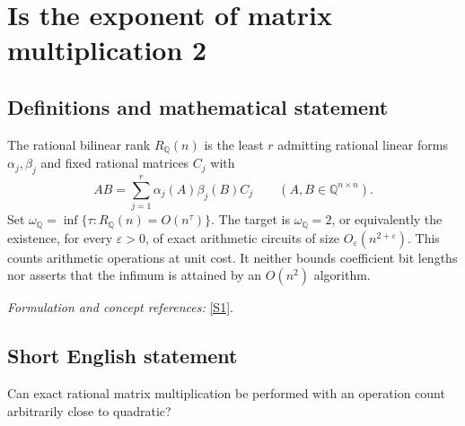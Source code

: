 \documentclass[11pt,a4paper]{article}
\newcommand{\Q}{\mathbb{Q}}
\newcommand{\sref}[2]{\hyperlink{source:#1:#2}{[S#2]}}
\newif\ifshowcatalogue
\newcommand{\cataloguescope}[1]{\ifshowcatalogue
 \paragraph{Exact scope in the supplied catalogue.}
 \begin{quote}\small #1\end{quote}\fi}
\numberwithin{equation}{section}
\begin{document}
\setcounter{section}{0}
\clearpage
\section*{\texorpdfstring{Is the exponent of matrix multiplication 2}{Is the exponent of matrix multiplication 2}}\label{3100086}
\subsection{Definitions and mathematical statement}
The rational bilinear rank $R_{\Q}(n)$ is the least $r$ admitting rational linear forms $\alpha_j,\beta_j$ and fixed rational matrices $C_j$ with
\[
 AB=\sum_{j=1}^r\alpha_j(A)\beta_j(B)C_j\qquad(A,B\in\Q^{n\times n}).
\]
Set $\omega_{\Q}=\inf\{\tau:R_{\Q}(n)=O(n^\tau)\}$. The target is $\omega_{\Q}=2$, or equivalently the existence, for every $\varepsilon>0$, of exact arithmetic circuits of size $O_\varepsilon(n^{2+\varepsilon})$. This counts arithmetic operations at unit cost. It neither bounds coefficient bit lengths nor asserts that the infimum is attained by an $O(n^2)$ algorithm.
\par\smallskip\textit{Formulation and concept references:} \sref{3100086}{1}.
\cataloguescope{Let R\_Q(n) be the tensor rank over Q of the bilinear map multiplying two n by n rational matrices: the least r for which AB is a sum of r products alpha\_j(A) beta\_j(B) C\_j, with rational linear forms alpha\_j, beta\_j and rational output matrices C\_j. Set omega\_Q = inf\{tau in R : R\_Q(n) = O(n\textasciicircum{}tau)\}. Prove omega\_Q = 2. Equivalently, for every epsilon > 0, exact multiplication admits division-free arithmetic circuits over Q of size O(n\textasciicircum{}(2+epsilon)), counting rational additions, subtractions, multiplications and constant scalar operations at unit cost. Circuits need not be uniformly generated and rational coefficient bit lengths are not charged. Constants and thresholds may depend on epsilon. Literal O(n\textasciicircum{}2) attainment is not required.}
\subsection{Short English statement}
Can exact rational matrix multiplication be performed with an operation count arbitrarily close to quadratic?
\end{document}
